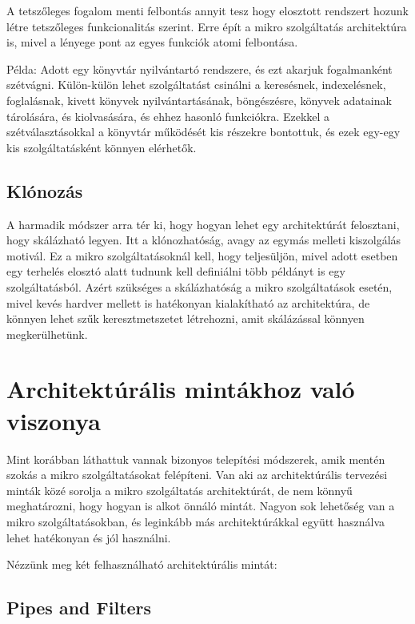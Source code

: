 \documentclass[11pt,magyar,a4paper,oneside,]{report}
\begin{document}
A tetszőleges fogalom menti felbontás annyit tesz hogy elosztott
rendszert hozunk létre tetszőleges funkcionalitás szerint. Erre épít a
mikro szolgáltatás architektúra is, mivel a lényege pont az egyes
funkciók atomi felbontása.

Példa: Adott egy könyvtár nyilvántartó rendszere, és ezt akarjuk
fogalmanként szétvágni. Külön-külön lehet szolgáltatást csinálni a
keresésnek, indexelésnek, foglalásnak, kivett könyvek nyilvántartásának,
böngészésre, könyvek adatainak tárolására, és kiolvasására, és ehhez
hasonló funkciókra. Ezekkel a szétválasztásokkal a könyvtár működését
kis részekre bontottuk, és ezek egy-egy kis szolgáltatásként könnyen
elérhetők.

\subsection{Klónozás}\label{kluxf3nozuxe1s}

A harmadik módszer arra tér ki, hogy hogyan lehet egy architektúrát
felosztani, hogy skálázható legyen. Itt a klónozhatóság, avagy az egymás
melleti kiszolgálás motivál. Ez a mikro szolgáltatásoknál kell, hogy
teljesüljön, mivel adott esetben egy terhelés elosztó alatt tudnunk kell
definiálni több példányt is egy szolgáltatásból. Azért szükséges a
skálázhatóság a mikro szolgáltatások esetén, mivel kevés hardver mellett
is hatékonyan kialakítható az architektúra, de könnyen lehet szűk
keresztmetszetet létrehozni, amit skálázással könnyen megkerülhetünk.

\section{Architektúrális mintákhoz való
viszonya}\label{architektuxfaruxe1lis-mintuxe1khoz-valuxf3-viszonya}

Mint korábban láthattuk vannak bizonyos telepítési módszerek, amik
mentén szokás a mikro szolgáltatásokat felépíteni. Van aki az
architektúrális tervezési minták közé sorolja a mikro szolgáltatás
architektúrát, de nem könnyű meghatározni, hogy hogyan is alkot önnáló
mintát. Nagyon sok lehetőség van a mikro szolgáltatásokban, és leginkább
más architektúrákkal együtt használva lehet hatékonyan és jól használni.

Nézzünk meg két felhasználható architektúrális mintát:

\subsection{Pipes and Filters}\label{pipes-and-filters}
\end{document}
